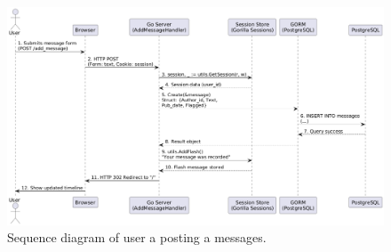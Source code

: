 \begin{figure}[H]
\includegraphics[width=\textwidth]{images/user-seq-diagram.png}
\centering
\caption{Sequence diagram of user a posting a messages.}
\end{figure}